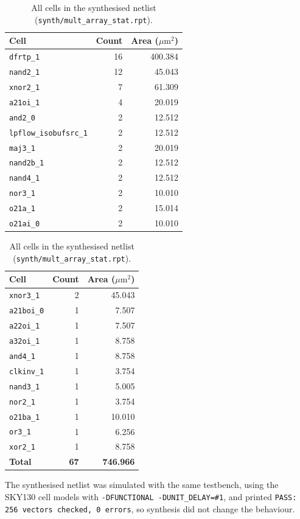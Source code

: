 \documentclass[11pt,a4paper]{article}
\newcommand{\cell}[1]{\texttt{#1}}
\newcommand{\umsq}{\ensuremath{\mu\mathrm{m}^2}}
\begin{document}
\begin{table}[H]
\centering
\small
\begin{tabular}{lrr}
\toprule
Cell & Count & Area (\umsq) \\
\midrule
\cell{dfrtp\_1} & 16 & 400.384 \\
\cell{nand2\_1} & 12 & 45.043 \\
\cell{xnor2\_1} & 7 & 61.309 \\
\cell{a21oi\_1} & 4 & 20.019 \\
\cell{and2\_0} & 2 & 12.512 \\
\cell{lpflow\_isobufsrc\_1} & 2 & 12.512 \\
\cell{maj3\_1} & 2 & 20.019 \\
\cell{nand2b\_1} & 2 & 12.512 \\
\cell{nand4\_1} & 2 & 12.512 \\
\cell{nor3\_1} & 2 & 10.010 \\
\cell{o21a\_1} & 2 & 15.014 \\
\cell{o21ai\_0} & 2 & 10.010 \\
\bottomrule
\end{tabular}
\hspace{1cm}
\begin{tabular}{lrr}
\toprule
Cell & Count & Area (\umsq) \\
\midrule
\cell{xnor3\_1} & 2 & 45.043 \\
\cell{a21boi\_0} & 1 & 7.507 \\
\cell{a22oi\_1} & 1 & 7.507 \\
\cell{a32oi\_1} & 1 & 8.758 \\
\cell{and4\_1} & 1 & 8.758 \\
\cell{clkinv\_1} & 1 & 3.754 \\
\cell{nand3\_1} & 1 & 5.005 \\
\cell{nor2\_1} & 1 & 3.754 \\
\cell{o21ba\_1} & 1 & 10.010 \\
\cell{or3\_1} & 1 & 6.256 \\
\cell{xor2\_1} & 1 & 8.758 \\
\midrule
\textbf{Total} & \textbf{67} & \textbf{746.966} \\
\bottomrule
\end{tabular}
\caption{All cells in the synthesised netlist (\texttt{synth/mult\_array\_stat.rpt}).}
\end{table}

The synthesised netlist was simulated with the same testbench, using the SKY130
cell models with \texttt{-DFUNCTIONAL -DUNIT\_DELAY=\#1}, and printed
\texttt{PASS: 256 vectors checked, 0 errors}, so synthesis did not change the
behaviour.
\end{document}
